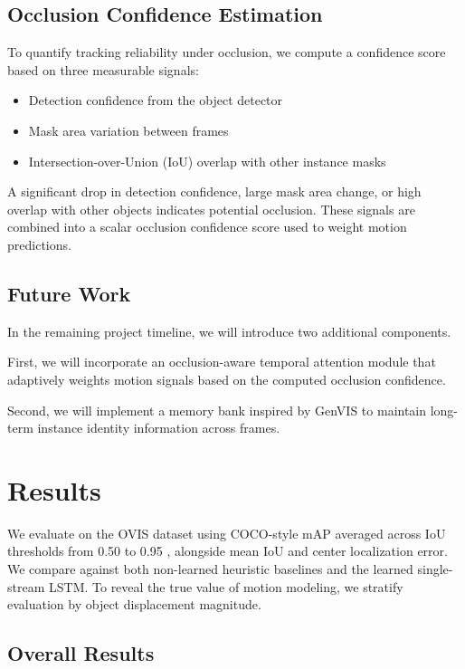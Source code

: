 \documentclass{article}
\begin{document}
\subsection{Occlusion Confidence Estimation}

To quantify tracking reliability under occlusion, we compute a confidence score based on three measurable signals:

\begin{itemize}
\item Detection confidence from the object detector
\item Mask area variation between frames
\item Intersection-over-Union (IoU) overlap with other instance masks
\end{itemize}

A significant drop in detection confidence, large mask area change, or high overlap with other objects indicates potential occlusion. These signals are combined into a scalar occlusion confidence score used to weight motion predictions.

\subsection{Future Work}

In the remaining project timeline, we will introduce two additional components.

First, we will incorporate an occlusion-aware temporal attention module that adaptively weights motion signals based on the computed occlusion confidence.

Second, we will implement a memory bank inspired by GenVIS to maintain long-term instance identity information across frames.

\section{Results}

We evaluate on the OVIS dataset \cite{qi2022ovis} using COCO-style mAP averaged across IoU thresholds from 0.50 to 0.95 \cite{lin2014coco}, alongside mean IoU and center localization error. We compare against both non-learned heuristic baselines and the learned single-stream LSTM. To reveal the true value of motion modeling, we stratify evaluation by object displacement magnitude.

\subsection{Overall Results}
\end{document}
